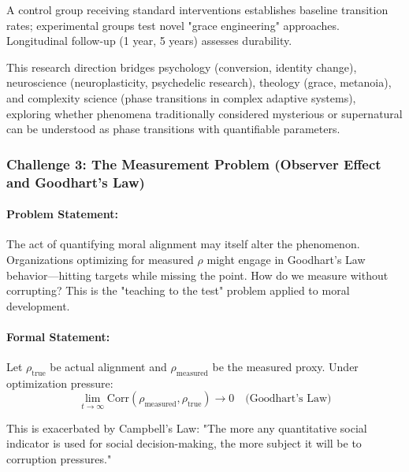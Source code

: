 \documentclass[11pt,a4paper]{article}
\theoremstyle{definition}
\theoremstyle{remark}
\begin{document}
A control group receiving standard interventions establishes baseline transition rates; experimental groups test novel "grace engineering" approaches. Longitudinal follow-up (1 year, 5 years) assesses durability.

This research direction bridges psychology (conversion, identity change), neuroscience (neuroplasticity, psychedelic research), theology (grace, metanoia), and complexity science (phase transitions in complex adaptive systems), exploring whether phenomena traditionally considered mysterious or supernatural can be understood as phase transitions with quantifiable parameters.

\subsubsection{Challenge 3: The Measurement Problem (Observer Effect and Goodhart's Law)}

\paragraph{Problem Statement:} 
The act of quantifying moral alignment may itself alter the phenomenon. Organizations optimizing for measured \(\rho\) might engage in Goodhart's Law behavior—hitting targets while missing the point. How do we measure without corrupting? This is the "teaching to the test" problem applied to moral development.

\paragraph{Formal Statement:} 
Let \(\rho_{\text{true}}\) be actual alignment and \(\rho_{\text{measured}}\) be the measured proxy. Under optimization pressure:
\begin{equation}
\lim_{t \to \infty} \text{Corr}(\rho_{\text{measured}}, \rho_{\text{true}}) \to 0 \quad \text{(Goodhart's Law)}
\end{equation}

This is exacerbated by Campbell's Law: "The more any quantitative social indicator is used for social decision-making, the more subject it will be to corruption pressures."
\end{document}
